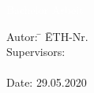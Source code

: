 %
%
%
%


\begin{titlepage}


{
\vspace{5mm}
{\Huge\textcolor{white}{Bachelor Arbeit}}\\[4mm]
{\Huge\textcolor{white}{\textbf{\mytitle}}}

{\color{white} 
\begin{tabbing}
Autor: \hspace{20mm} \= \myauthor \hspace{20mm} \= ETH-Nr. \myethnr \\[3mm]
Supervisors: \> \myprofessor\\[1mm]
\> \mysupervisor\\[3mm]
Date: 29.05.2020
\end{tabbing}
}
}
\vspace{7mm}
%  



\end{titlepage}


%

